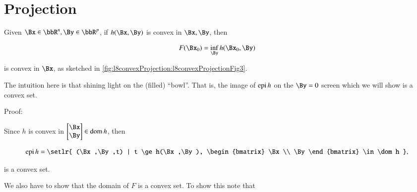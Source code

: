 %
%

\section{Projection}

Given \( \Bx \in \bbR^n, \By \in \bbR^p \), if \( h(\Bx,\By) \) is convex in \( \Bx, \By \), then

\begin{dmath}\label{eqn:convexOptimizationLecture8:60}
F(\Bx_0) = \inf_\By h(\Bx_0,\By)
\end{dmath}

is convex in \( \Bx\), as sketched in \cref{fig:l8convexProjection:l8convexProjectionFig3}.


The intuition here is that shining light on the (filled) ``bowl''.  That is, the image of \( \operatorname{epi} h \) on the \( \By = 0 \) screen which we will show is a convex set.

Proof:

Since \( h \) is convex in \( \begin{bmatrix} \Bx \\ \By \end{bmatrix} \in \dom h \), then

\begin{equation}\label{eqn:convexOptimizationLecture8:80}
\epi h = \setlr{ (\Bx,\By,t) | t \ge h(\Bx,\By), \begin{bmatrix} \Bx \\ \By \end{bmatrix} \in \dom h },
\end{equation}

is a convex set.

We also have to show that the domain of \( F \) is a convex set.  To show this note that

